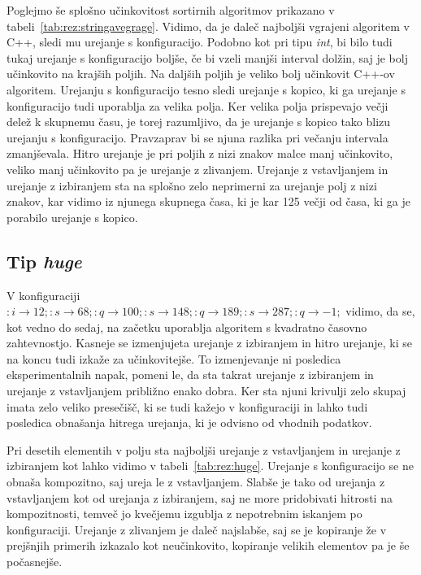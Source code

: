 \documentclass[a4paper,oneside,12pt]{article}
\newcommand{\lra}{\ensuremath{\longrightarrow}}
\begin{document}
Poglejmo še splošno učinkovitost sortirnih algoritmov prikazano v
tabeli~\ref{tab:rez:stringavegrage}. Vidimo, da je daleč najboljši vgrajeni
algoritem v C++, sledi mu urejanje s konfiguracijo. Podobno kot pri tipu
\emph{int}, bi bilo tudi tukaj urejanje s konfiguracijo boljše, če bi vzeli
manjši interval dolžin, saj je bolj učinkovito na krajših poljih. Na daljših
poljih je veliko bolj učinkovit C++-ov algoritem. Urejanju s konfiguracijo tesno
sledi urejanje s kopico, ki ga urejanje s konfiguracijo tudi uporablja za velika
polja. Ker velika polja prispevajo večji delež k skupnemu času, je torej
razumljivo, da je urejanje s kopico tako blizu urejanju s konfiguracijo.
Pravzaprav bi se njuna razlika pri večanju intervala zmanjševala.
Hitro urejanje je pri poljih z nizi znakov malce manj učinkovito, veliko manj
učinkovito pa je urejanje z zlivanjem. Urejanje z vstavljanjem in urejanje z
izbiranjem sta na splošno zelo neprimerni za urejanje polj z nizi znakov, kar
vidimo iz njunega skupnega časa, ki je kar 125 večji od časa, ki ga je porabilo
urejanje s kopico.

\subsection{Tip \emph{huge}}
V konfiguraciji $:i \lra 12;:s \lra 68;:q \lra 100;:s \lra 148;:q \lra 189;:s
\lra 287;:q \lra -1;$ vidimo, da se, kot vedno do sedaj, na začetku uporablja algoritem s kvadratno
časovno zahtevnostjo. Kasneje se izmenjujeta urejanje z izbiranjem in hitro
urejanje, ki se na koncu tudi izkaže za učinkovitejše. To izmenjevanje ni
posledica eksperimentalnih napak, pomeni le, da sta takrat urejanje z izbiranjem
in urejanje z vstavljanjem približno enako dobra. Ker sta njuni krivulji zelo
skupaj imata zelo veliko presečišč, ki se tudi kažejo v konfiguraciji in lahko
tudi posledica obnašanja hitrega urejanja, ki je odvisno od vhodnih podatkov.

Pri desetih elementih v polju sta najboljši urejanje z vstavljanjem in urejanje
z izbiranjem kot lahko vidimo v tabeli~\ref{tab:rez:huge}.
Urejanje s konfiguracijo se ne obnaša kompozitno, saj ureja le z
vstavljanjem. Slabše je tako od urejanja z vstavljanjem kot od urejanja z
izbiranjem, saj ne more pridobivati hitrosti na kompozitnosti, temveč jo
kvečjemu izgublja z nepotrebnim iskanjem po konfiguraciji. Urejanje z zlivanjem
je daleč najslabše, saj se je  kopiranje že v prejšnjih primerih izkazalo kot
neučinkovito, kopiranje velikih elementov pa je še počasnejše. 
\end{document}
